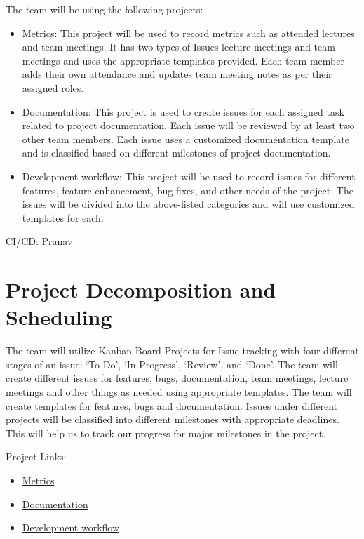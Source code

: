 \documentclass{article}
\begin{document}
The team will be using the following projects:

\begin{itemize}
\item Metrics: This project will be used to record metrics such as attended lectures and team meetings. It has two types of Issues lecture meetings and team meetings and uses the appropriate templates provided. Each team member adds their own attendance and updates team meeting notes as per their assigned roles.
\item Documentation: This project is used to create issues for each assigned task related to project documentation. Each issue will be reviewed by at least two other team members. Each issue uses a customized documentation template and is classified based on different milestones of project documentation. 
\item Development workflow: This project will be used to record issues for different features, feature enhancement, bug fixes, and other needs of the project. The issues will be divided into the above-listed categories and will use customized templates for each. 
\end{itemize}

CI/CD: Pranav

\section{Project Decomposition and Scheduling}

The team will utilize Kanban Board Projects for Issue tracking with four different stages of an issue: ‘To Do’, ‘In Progress’, ‘Review’, and ‘Done’. The team will create different issues for features, bugs, documentation, team meetings, lecture meetings and other things as needed using appropriate templates. The team will create templates for features, bugs and documentation. Issues under different projects will be classified into different milestones with appropriate deadlines. This will help us to track our progress for major milestones in the project. 

Project Links:
\begin{itemize}
\item  
\href{https://github.com/users/Inreet-Kaur/projects/4}{Metrics}
\item  
\href{https://github.com/users/Inreet-Kaur/projects/2}{Documentation} 
\item 
\href{https://github.com/users/Inreet-Kaur/projects/6}{Development workflow}
\end{itemize}
\end{document}
